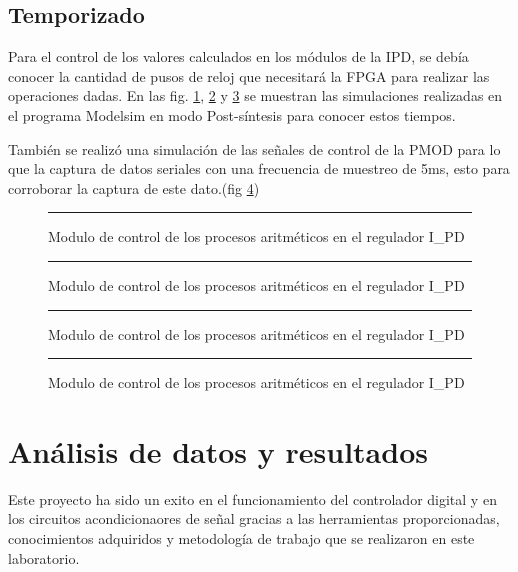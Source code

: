 \documentclass[12pt,a4paper]{article} %
\begin{document}
\subsection{Temporizado}

Para el control de los valores calculados en los módulos de la IPD, se debía conocer la cantidad de pusos de reloj que necesitará la FPGA para realizar las operaciones dadas. En las fig. \ref{fig:SimP}, \ref{fig:SimD} y \ref{fig:SimI} se muestran las simulaciones realizadas en el programa Modelsim en modo Post-síntesis para conocer estos tiempos.

También se realizó una simulación de las señales de control de la PMOD para lo que la captura de datos seriales con una frecuencia de muestreo de 5ms, esto para corroborar la captura de este dato.(fig \ref{fig:SimSer})

\begin{figure}[htbp]
  \centering
    \rule{35em}{0.3pt}
  \caption[SimP]{Modulo de control de los procesos aritméticos en el regulador I\_PD}
  \label{fig:SimP}
\end{figure}

\begin{figure}[htbp]
  \centering
    \rule{35em}{0.3pt}
  \caption[SimD]{Modulo de control de los procesos aritméticos en el regulador I\_PD}
  \label{fig:SimD}
\end{figure}

\begin{figure}[htbp]
  \centering
    \rule{35em}{0.3pt}
  \caption[SimI]{Modulo de control de los procesos aritméticos en el regulador I\_PD}
  \label{fig:SimI}
\end{figure}

\begin{figure}[htbp]
  \centering
    \rule{35em}{0.3pt}
  \caption[SimSer]{Modulo de control de los procesos aritméticos en el regulador I\_PD}
  \label{fig:SimSer}
\end{figure}

\section{Análisis de datos y resultados}

Este proyecto ha sido un exito en el funcionamiento del controlador digital y en los circuitos acondicionaores de señal gracias a las herramientas proporcionadas, conocimientos adquiridos y metodología de trabajo que se realizaron en este laboratorio.
\end{document}
